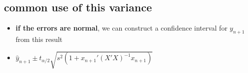 \subsection{common use of this variance}

\begin{itemize}
\item \textbf{if the errors are normal}, we can construct a confidence
       interval for $y_{n+1}$ from this result
\item $\hat y_{n+1} \pm t_{\alpha/2} \sqrt{s^2 (1 + x_{n+1}'(X'X)^{-1}x_{n+1})}$
\end{itemize}

